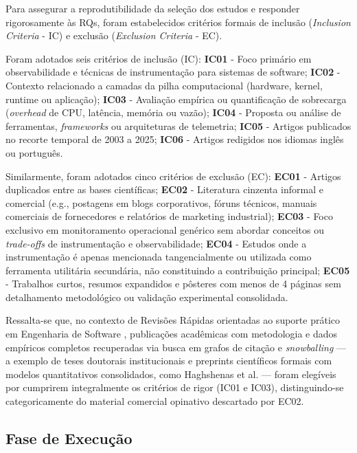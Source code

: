 \documentclass[sigconf, anonymous]{acmart}
\begin{document}
Para assegurar a reprodutibilidade da seleção dos estudos e responder rigorosamente às RQs, foram estabelecidos critérios formais de inclusão (\textit{Inclusion Criteria} - IC) e exclusão (\textit{Exclusion Criteria} - EC). 

Foram adotados seis critérios de inclusão (IC): \textbf{IC01} - Foco primário em observabilidade e técnicas de instrumentação para sistemas de software; \textbf{IC02} - Contexto relacionado a camadas da pilha computacional (hardware, kernel, runtime ou aplicação); \textbf{IC03} - Avaliação empírica ou quantificação de sobrecarga (\textit{overhead} de CPU, latência, memória ou vazão); \textbf{IC04} - Proposta ou análise de ferramentas, \textit{frameworks} ou arquiteturas de telemetria; \textbf{IC05} - Artigos publicados no recorte temporal de 2003 a 2025; \textbf{IC06} - Artigos redigidos nos idiomas inglês ou português.

Similarmente, foram adotados cinco critérios de exclusão (EC): \textbf{EC01} - Artigos duplicados entre as bases científicas; \textbf{EC02} - Literatura cinzenta informal e comercial (e.g., postagens em blogs corporativos, fóruns técnicos, manuais comerciais de fornecedores e relatórios de marketing industrial); \textbf{EC03} - Foco exclusivo em monitoramento operacional genérico sem abordar conceitos ou \textit{trade-offs} de instrumentação e observabilidade; \textbf{EC04} - Estudos onde a instrumentação é apenas mencionada tangencialmente ou utilizada como ferramenta utilitária secundária, não constituindo a contribuição principal; \textbf{EC05} - Trabalhos curtos, resumos expandidos e pôsteres com menos de 4 páginas sem detalhamento metodológico ou validação experimental consolidada.

Ressalta-se que, no contexto de Revisões Rápidas orientadas ao suporte prático em Engenharia de Software \cite{cartaxo_2018}, publicações acadêmicas com metodologia e dados empíricos completos recuperadas via busca em grafos de citação e \textit{snowballing} — a exemplo de teses doutorais institucionais e preprints científicos formais com modelos quantitativos consolidados, como Haghshenas et al. \cite{haghshenas_2023} — foram elegíveis por cumprirem integralmente os critérios de rigor (IC01 e IC03), distinguindo-se categoricamente do material comercial opinativo descartado por EC02.

\subsection{Fase de Execução}
\end{document}
